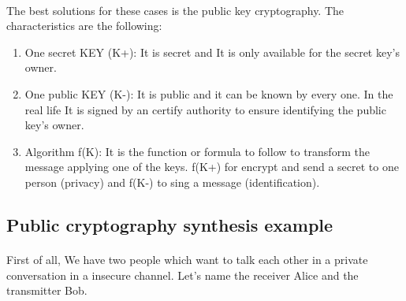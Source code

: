 \documentclass{article}
\begin{document}
\paragraph{}
The best solutions for these cases is the public key cryptography. The characteristics are the following:
\begin{enumerate}
    \item One secret KEY (K+): It is secret and It is only available for the secret key's owner.
    \item One public KEY (K-): It is public and it can be known by every one. In the real life It is signed by an certify authority to ensure identifying the public key's owner.
    \item Algorithm f(K): It is the function or formula to follow to transform the message applying one of the keys. f(K+) for encrypt and send a secret to one person (privacy) and f(K-) to sing a message (identification).
\end{enumerate}
\subsection{Public cryptography synthesis example}
\paragraph{}
First of all, We have two people which want to talk each other in a private conversation in a insecure channel. Let's name the receiver Alice and the transmitter Bob.
\paragraph{}
\end{document}
